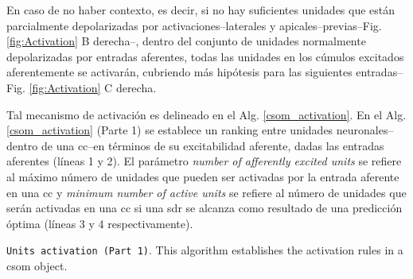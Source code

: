 {En caso de no haber contexto, es decir, si no hay suficientes unidades que están parcialmente depolarizadas 
por activaciones--laterales y apicales--previas--Fig. \ref{fig:Activation} B derecha--,
dentro del conjunto de unidades
normalmente depolarizadas por entradas aferentes,
todas las unidades en los cúmulos excitados aferentemente se activarán, cubriendo más hipótesis para las siguientes entradas--Fig. \ref{fig:Activation} C derecha.

Tal mecanismo de activación es delineado en el Alg. \ref{csom_activation}. En el Alg. \ref{csom_activation} (Parte 1) se establece un ranking entre unidades neuronales--dentro de una \gls{cc}--en términos de su excitabilidad aferente, dadas las entradas aferentes (líneas 1 y 2).
El parámetro \emph{number of afferently excited units} se refiere al máximo número de unidades que pueden ser activadas por la entrada aferente en una \gls{cc} y \emph{minimum number of active units} se refiere al número de unidades que serán activadas en una \gls{cc} si una \gls{sdr} se alcanza como resultado de una predicción óptima (líneas 3 y 4 respectivamente).

\begin{algorithm}
	\caption{\texttt{Units activation (Part 1)}. This algorithm establishes the activation rules in a \gls{csom} object.}
\label{csom_activation}
\begin{algorithmic}[1]




	\ELSE
	\ENDIF


\end{algorithmic}
\end{algorithm}}
